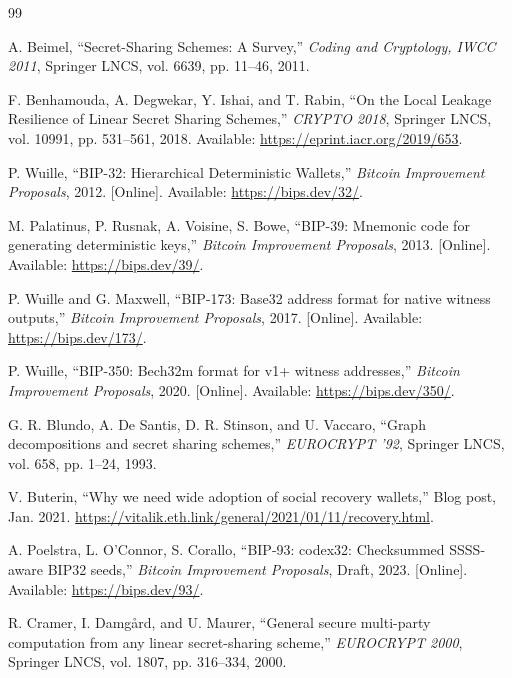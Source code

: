 \documentclass[11pt]{article}
\begin{document}
\begin{thebibliography}{99}

A. Beimel,
``Secret-Sharing Schemes: A Survey,''
\textit{Coding and Cryptology, IWCC 2011}, Springer LNCS, vol. 6639, pp. 11--46, 2011.

F. Benhamouda, A. Degwekar, Y. Ishai, and T. Rabin,
``On the Local Leakage Resilience of Linear Secret Sharing Schemes,''
\textit{CRYPTO 2018}, Springer LNCS, vol. 10991, pp. 531--561, 2018.
Available: \url{https://eprint.iacr.org/2019/653}.

P. Wuille,
``BIP-32: Hierarchical Deterministic Wallets,''
\textit{Bitcoin Improvement Proposals}, 2012. [Online]. Available: \url{https://bips.dev/32/}.

M. Palatinus, P. Rusnak, A. Voisine, S. Bowe,
``BIP-39: Mnemonic code for generating deterministic keys,''
\textit{Bitcoin Improvement Proposals}, 2013. [Online]. Available: \url{https://bips.dev/39/}.

P. Wuille and G. Maxwell,
``BIP-173: Base32 address format for native witness outputs,''
\textit{Bitcoin Improvement Proposals}, 2017. [Online]. Available: \url{https://bips.dev/173/}.

P. Wuille,
``BIP-350: Bech32m format for v1+ witness addresses,''
\textit{Bitcoin Improvement Proposals}, 2020. [Online]. Available: \url{https://bips.dev/350/}.

G. R. Blundo, A. De Santis, D. R. Stinson, and U. Vaccaro,
``Graph decompositions and secret sharing schemes,''
\textit{EUROCRYPT '92}, Springer LNCS, vol. 658, pp. 1--24, 1993.

V. Buterin,
``Why we need wide adoption of social recovery wallets,''
Blog post, Jan. 2021. \url{https://vitalik.eth.link/general/2021/01/11/recovery.html}.

A. Poelstra, L. O'Connor, S. Corallo,
``BIP-93: codex32: Checksummed SSSS-aware BIP32 seeds,''
\textit{Bitcoin Improvement Proposals}, Draft, 2023. [Online]. Available: \url{https://bips.dev/93/}.

R. Cramer, I. Damg{\aa}rd, and U. Maurer,
``General secure multi-party computation from any linear secret-sharing scheme,''
\textit{EUROCRYPT 2000}, Springer LNCS, vol. 1807, pp. 316--334, 2000.


\end{thebibliography}
\end{document}

